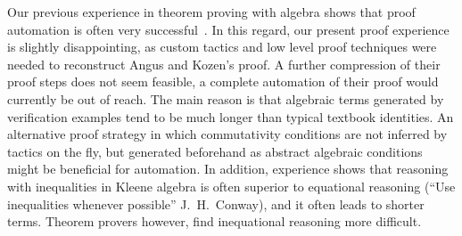 \documentclass{llncs}
\begin{document}
Our previous experience in theorem proving with algebra shows that
proof automation is often very successful~\cite{self}. In this regard,
our present proof experience is slightly disappointing, as custom
tactics and low level proof techniques were needed to reconstruct
Angus and Kozen's proof. A further compression of their proof steps
does not seem feasible, a complete automation of their proof would
currently be out of reach. The main reason is that algebraic terms
generated by verification examples tend to be much longer than typical
textbook identities. An alternative proof strategy in which
commutativity conditions are not inferred by tactics on the fly, but
generated beforehand as abstract algebraic conditions might be
beneficial for automation. In addition, experience shows that
reasoning with inequalities in Kleene algebra is often superior to
equational reasoning (``Use inequalities whenever possible''
J.~H.~Conway), and it often leads to shorter terms. Theorem provers
however, find inequational reasoning more difficult.

\end{document}
